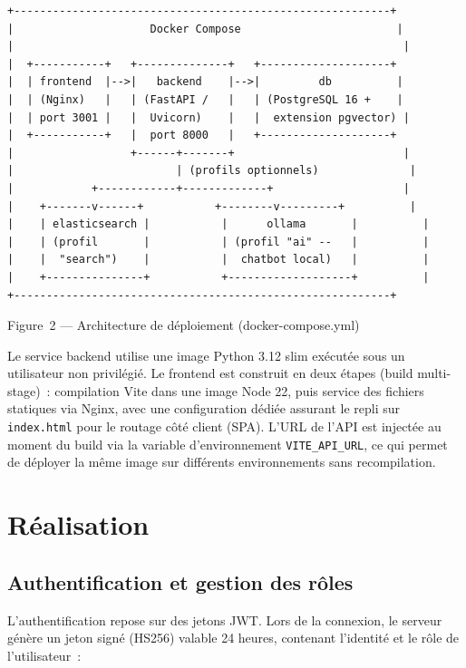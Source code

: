 \documentclass[11pt,a4paper]{report}
\begin{document}
\begin{lstlisting}
+----------------------------------------------------------+
|                     Docker Compose                        |
|                                                            |
|  +-----------+   +--------------+   +--------------------+
|  | frontend  |-->|   backend    |-->|         db          |
|  | (Nginx)   |   | (FastAPI /   |   | (PostgreSQL 16 +    |
|  | port 3001 |   |  Uvicorn)    |   |  extension pgvector) |
|  +-----------+   |  port 8000   |   +--------------------+
|                  +------+-------+                          |
|                         | (profils optionnels)              |
|            +------------+-------------+                    |
|    +-------v------+           +--------v---------+          |
|    | elasticsearch |           |      ollama       |          |
|    | (profil       |           | (profil "ai" --   |          |
|    |  "search")    |           |  chatbot local)   |          |
|    +---------------+           +-------------------+          |
+----------------------------------------------------------+
\end{lstlisting}
\begin{center}\small\color{grey} Figure~2 --- Architecture de déploiement (docker-compose.yml) \end{center}

Le service backend utilise une image Python 3.12 slim exécutée sous un utilisateur non privilégié. Le
frontend est construit en deux étapes (build multi-stage)~: compilation Vite dans une image Node 22, puis
service des fichiers statiques via Nginx, avec une configuration dédiée assurant le repli sur
\texttt{index.html} pour le routage côté client (SPA). L'URL de l'API est injectée au moment du build via la
variable d'environnement \texttt{VITE\_API\_URL}, ce qui permet de déployer la même image sur différents
environnements sans recompilation.

\chapter{Réalisation}

\section{Authentification et gestion des rôles}

L'authentification repose sur des jetons JWT. Lors de la connexion, le serveur génère un jeton signé
(HS256) valable 24 heures, contenant l'identité et le rôle de l'utilisateur~:
\end{document}

